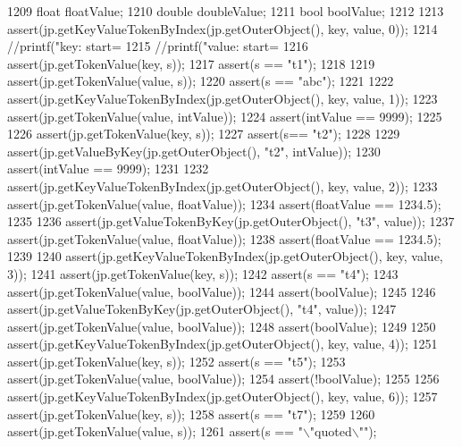 \begin{DoxyCode}
{{{{{{{{{{{{{{{{1209         \textcolor{keywordtype}{float} floatValue;
1210         \textcolor{keywordtype}{double} doubleValue;
1211         \textcolor{keywordtype}{bool} boolValue;
1212 
1213         assert(jp.getKeyValueTokenByIndex(jp.getOuterObject(), key, value, 0));
1214         \textcolor{comment}{//printf("key: start=%
1215         \textcolor{comment}{//printf("value: start=%
1216         assert(jp.getTokenValue(key, s));
1217         assert(s == \textcolor{stringliteral}{"t1"});
1218 
1219         assert(jp.getTokenValue(value, s));
1220         assert(s == \textcolor{stringliteral}{"abc"});
1221 
1222         assert(jp.getKeyValueTokenByIndex(jp.getOuterObject(), key, value, 1));
1223         assert(jp.getTokenValue(value, intValue));
1224         assert(intValue == 9999);
1225 
1226         assert(jp.getTokenValue(key, s));
1227         assert(s== \textcolor{stringliteral}{"t2"});
1228 
1229         assert(jp.getValueByKey(jp.getOuterObject(), \textcolor{stringliteral}{"t2"}, intValue));
1230         assert(intValue == 9999);
1231 
1232         assert(jp.getKeyValueTokenByIndex(jp.getOuterObject(), key, value, 2));
1233         assert(jp.getTokenValue(value, floatValue));
1234         assert(floatValue == 1234.5);
1235 
1236         assert(jp.getValueTokenByKey(jp.getOuterObject(), \textcolor{stringliteral}{"t3"}, value));
1237         assert(jp.getTokenValue(value, floatValue));
1238         assert(floatValue == 1234.5);
1239 
1240         assert(jp.getKeyValueTokenByIndex(jp.getOuterObject(), key, value, 3));
1241         assert(jp.getTokenValue(key, s));
1242         assert(s == \textcolor{stringliteral}{"t4"});
1243         assert(jp.getTokenValue(value, boolValue));
1244         assert(boolValue);
1245 
1246         assert(jp.getValueTokenByKey(jp.getOuterObject(), \textcolor{stringliteral}{"t4"}, value));
1247         assert(jp.getTokenValue(value, boolValue));
1248         assert(boolValue);
1249 
1250         assert(jp.getKeyValueTokenByIndex(jp.getOuterObject(), key, value, 4));
1251         assert(jp.getTokenValue(key, s));
1252         assert(s == \textcolor{stringliteral}{"t5"});
1253         assert(jp.getTokenValue(value, boolValue));
1254         assert(!boolValue);
1255 
1256         assert(jp.getKeyValueTokenByIndex(jp.getOuterObject(), key, value, 6));
1257         assert(jp.getTokenValue(key, s));
1258         assert(s == \textcolor{stringliteral}{"t7"});
1259 
1260         assert(jp.getTokenValue(value, s));
1261         assert(s == \textcolor{stringliteral}{"\(\backslash\)"quoted\(\backslash\)""});
}}}}}}}}}}}}}}}}}}
\end{DoxyCode}
